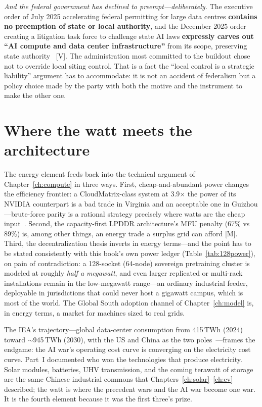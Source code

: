 \emph{And the federal government has declined to preempt---deliberately.} The executive order of July 2025 accelerating federal permitting for large data centres \textbf{contains no preemption of state or local authority}, and the December 2025 order creating a litigation task force to challenge state AI laws \textbf{expressly carves out ``AI compute and data center infrastructure''} from its scope, preserving state authority~\cite{federal-nopreempt} [V]. The administration most committed to the buildout chose not to override local siting control. That is a fact the ``local control is a strategic liability'' argument has to accommodate: it is not an accident of federalism but a policy choice made by the party with both the motive and the instrument to make the other one.

\section{Where the watt meets the architecture}

The energy element feeds back into the technical argument of Chapter~\ref{ch:compute} in three ways. First, cheap-and-abundant power changes the efficiency frontier: a CloudMatrix-class system at 3.9$\times$ the power of its NVIDIA counterpart is a bad trade in Virginia and an acceptable one in Guizhou---brute-force parity is a rational strategy precisely where watts are the cheap input~\cite{cloudmatrix}. Second, the capacity-first LPDDR architecture's MFU penalty (67\% vs 89\%) is, among other things, an energy trade a surplus grid can afford [M]. Third, the decentralization thesis inverts in energy terms---and the point has to be stated consistently with this book's own power ledger (Table~\ref{tab:128power}), on pain of contradiction: a 128-socket (64-node) sovereign pretraining cluster is modeled at roughly \emph{half a megawatt}, and even larger replicated or multi-rack installations remain in the low-megawatt range---an ordinary industrial feeder, deployable in jurisdictions that could never host a gigawatt campus, which is most of the world. The Global South adoption channel of Chapter~\ref{ch:model} is, in energy terms, a market for machines sized to real grids.

The IEA's trajectory---global data-center consumption from 415\,TWh (2024) toward $\sim$945\,TWh (2030), with the US and China as the two poles~\cite{iea-energy-ai}---frames the endgame: the AI war's operating cost curve is converging on the electricity cost curve. Part~I documented who won the technologies that produce electricity. Solar modules, batteries, UHV transmission, and the coming terawatt of storage are the same Chinese industrial commons that Chapters~\ref{ch:solar}--\ref{ch:ev} described; the watt is where the precedent wars and the AI war become one war. It is the fourth element because it was the first three's prize.
